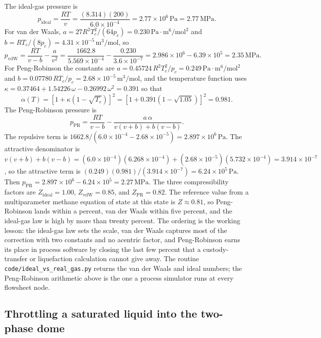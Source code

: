 The ideal-gas pressure is
\[
p_{\text{ideal}} = \frac{RT}{v} = \frac{(8.314)(200)}{6.0\times 10^{-4}}
= 2.77\times 10^6\,\text{Pa} = 2.77\,\text{MPa}.
\]
For van der Waals, $a = 27R^2T_c^2/(64p_c) = 0.230\,\text{Pa}\cdot
\text{m}^6/\text{mol}^2$ and $b = RT_c/(8p_c) = 4.31\times
10^{-5}\,\text{m}^3/\text{mol}$, so
\[
p_{\text{vdW}} = \frac{RT}{v - b} - \frac{a}{v^2}
= \frac{1662.8}{5.569\times 10^{-4}} - \frac{0.230}{3.6\times 10^{-7}}
= 2.986\times 10^6 - 6.39\times 10^5 = 2.35\,\text{MPa}.
\]
For Peng-Robinson the constants are $a = 0.45724\,R^2T_c^2/p_c =
0.249\,\text{Pa}\cdot\text{m}^6/\text{mol}^2$ and $b = 0.07780\,
RT_c/p_c = 2.68\times 10^{-5}\,\text{m}^3/\text{mol}$, and the
temperature function uses $\kappa = 0.37464 + 1.54226\,\omega -
0.26992\,\omega^2 = 0.391$ so that
\[
\alpha(T) = \left[1 + \kappa\left(1 - \sqrt{T_r}\right)\right]^2
= \left[1 + 0.391\left(1 - \sqrt{1.05}\right)\right]^2 = 0.981.
\]
The Peng-Robinson pressure is
\[
p_{\text{PR}} = \frac{RT}{v - b} - \frac{a\,\alpha}{v(v+b) + b(v-b)}.
\]
The repulsive term is $1662.8/(6.0\times 10^{-4} - 2.68\times 10^{-5}) =
2.897\times 10^6\,\text{Pa}$. The attractive denominator is
$v(v+b) + b(v-b) = (6.0\times 10^{-4})(6.268\times 10^{-4}) +
(2.68\times 10^{-5})(5.732\times 10^{-4}) = 3.914\times 10^{-7}$, so the
attractive term is $(0.249)(0.981)/(3.914\times 10^{-7}) = 6.24\times
10^5\,\text{Pa}$. Then $p_{\text{PR}} = 2.897\times 10^6 - 6.24\times
10^5 = 2.27\,\text{MPa}$. The three compressibility factors are
$Z_{\text{ideal}} = 1.00$, $Z_{\text{vdW}} = 0.85$, and $Z_{\text{PR}} =
0.82$. The reference value from a multiparameter methane equation of
state at this state is $Z \approx 0.81$, so Peng-Robinson lands within a
percent, van der Waals within five percent, and the ideal-gas law is
high by more than twenty percent. The ordering is the working lesson: the
ideal-gas law sets the scale, van der Waals captures most of the
correction with two constants and no acentric factor, and Peng-Robinson
earns its place in process software by closing the last few percent that
a custody-transfer or liquefaction calculation cannot give away. The
routine \texttt{code/ideal\_vs\_real\_gas.py} returns the van der Waals
and ideal numbers; the Peng-Robinson arithmetic above is the one a
process simulator runs at every flowsheet node.

\subsection{Throttling a saturated liquid into the two-phase dome}

